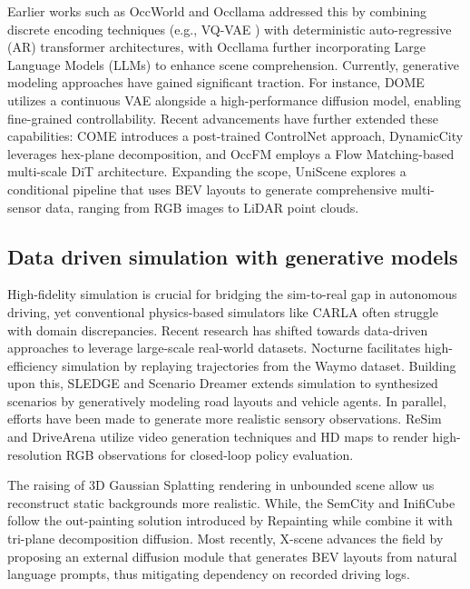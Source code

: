 Earlier works such as OccWorld \cite{zheng2024occworld} and Occllama \cite{wei2024occllama} addressed this by combining discrete encoding techniques (e.g., VQ-VAE \cite{van2017neural}) with deterministic auto-regressive (AR) transformer architectures, with Occllama further incorporating Large Language Models (LLMs) to enhance scene comprehension. Currently, generative modeling approaches have gained significant traction. For instance, DOME \cite{gu2024dome} utilizes a continuous VAE alongside a high-performance diffusion model, enabling fine-grained controllability. Recent advancements have further extended these capabilities: COME \cite{shi2025come} introduces a post-trained ControlNet \cite{zhang2023adding} approach, DynamicCity \cite{bian2024dynamiccity} leverages hex-plane decomposition, and OccFM \cite{liu2025towards} employs a Flow Matching-based multi-scale DiT \cite{peebles2023scalable} architecture. Expanding the scope, UniScene \cite{li2025uniscene} explores a conditional pipeline that uses BEV layouts to generate comprehensive multi-sensor data, ranging from RGB images to LiDAR point clouds. 

\subsection{Data driven simulation with generative models}

High-fidelity simulation is crucial for bridging the sim-to-real gap in autonomous driving, yet conventional physics-based simulators like CARLA \cite{Dosovitskiy17} often struggle with domain discrepancies. Recent research has shifted towards data-driven approaches to leverage large-scale real-world datasets. Nocturne \cite{vinitsky2022nocturne} facilitates high-efficiency simulation by replaying trajectories from the Waymo dataset. Building upon this, SLEDGE \cite{chitta2024sledge} and Scenario Dreamer\cite{rowe2025scenario} extends simulation to synthesized scenarios by generatively modeling road layouts and vehicle agents. In parallel, efforts have been made to generate more realistic sensory observations. ReSim \cite{yang2025resim} and DriveArena \cite{yang2025drivearena} utilize video generation techniques and HD maps to render high-resolution RGB observations for closed-loop policy evaluation. 

The raising of 3D Gaussian Splatting rendering in unbounded scene \cite{chen2024lidar, zhou2024hugsim, xiao2025splatco} allow us 
reconstruct static backgrounds more realistic. While, the SemCity\cite{lee2024semcity} and InifiCube\cite{lu2025infinicube} follow the out-painting solution introduced by Repainting\cite{lugmayr2022repaint} while combine it with tri-plane decomposition diffusion. Most recently, X-scene \cite{yang2025x} advances the field by proposing an external diffusion module that generates BEV layouts from natural language prompts, thus mitigating dependency on recorded driving logs. 
